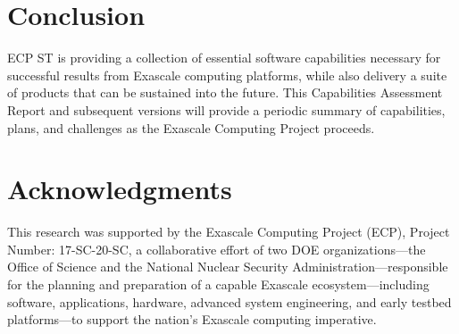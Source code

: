 \documentclass{ecpreport-publicv1}
\newcommand{\nnsa}{NNSA ST}
\begin{document}
%
%
%
%
%
%
%
%
%
%
%
%
%
%
%
%
%
%
%
%

\section{Conclusion}

ECP ST is providing a collection of essential software capabilities necessary for successful results from Exascale computing platforms, while also delivery a suite of products that can be sustained into the future.  This Capabilities Assessment Report and subsequent versions will provide a periodic summary of capabilities, plans, and challenges as the Exascale Computing Project proceeds.
\newpage
\section*{Acknowledgments}

This research was supported by the Exascale Computing Project (ECP), Project
Number: 17-SC-20-SC, a collaborative effort of two DOE organizations---the
Office of Science and the National Nuclear Security
Administration---responsible for the planning and preparation of a capable
Exascale ecosystem---including software, applications, hardware, advanced
system engineering, and early testbed platforms---to support the nation's
Exascale computing imperative.
\end{document}
